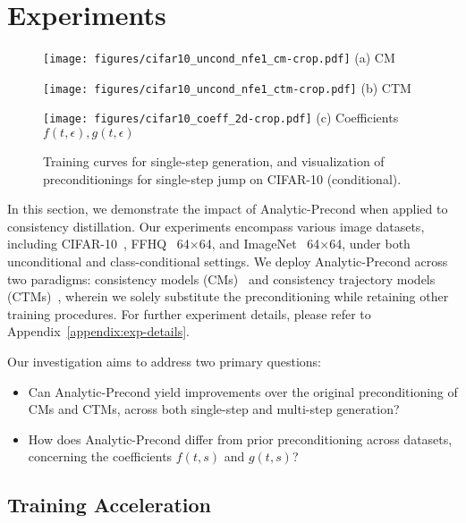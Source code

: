 \section{Experiments}
\begin{figure}[t]
    \centering
	\begin{minipage}[t]{.32\linewidth}
		\centering
		\texttt{[image: figures/cifar10\_uncond\_nfe1\_cm-crop.pdf]}
		\small{(a) CM}
	\end{minipage}
	\begin{minipage}[t]{.32\linewidth}
		\centering
		\texttt{[image: figures/cifar10\_uncond\_nfe1\_ctm-crop.pdf]}
		\small{(b) CTM}
	\end{minipage}
        \begin{minipage}[t]{.32\linewidth}
		\centering
		\texttt{[image: figures/cifar10\_coeff\_2d-crop.pdf]}
		\small{(c) Coefficients $f(t,\epsilon),g(t,\epsilon)$}
	\end{minipage}
	\caption{\label{fig:nfe-1}Training curves for single-step generation, and visualization of preconditionings for single-step jump on CIFAR-10 (conditional).}
	\vspace{-.1in}
\end{figure}
In this section, we demonstrate the impact of Analytic-Precond when applied to consistency distillation. Our experiments encompass various image datasets, including CIFAR-10~\citep{Krizhevsky09learningmultiple}, FFHQ~\citep{karras2019style} 64$\times$64, and ImageNet~\citep{deng2009imagenet} 64$\times$64, under both unconditional and class-conditional settings. We deploy Analytic-Precond across two paradigms: consistency models (CMs)~\citep{song2023consistency} and consistency trajectory models (CTMs)~\citep{kim2023consistency}, wherein we solely substitute the preconditioning while retaining other training procedures. For further experiment details, please refer to Appendix~\ref{appendix:exp-details}. 

Our investigation aims to address two primary questions:
\begin{itemize}
    \item Can Analytic-Precond yield improvements over the original preconditioning of CMs and CTMs, across both single-step and multi-step generation?
    \item How does Analytic-Precond differ from prior preconditioning across datasets, concerning the coefficients $f(t,s)$ and $g(t,s)$?
\end{itemize}
\subsection{Training Acceleration}
